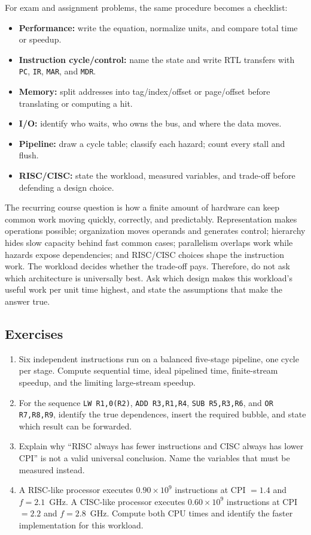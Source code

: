 \documentclass[11pt]{article}
\begin{document}
For exam and assignment problems, the same procedure becomes a checklist:
\begin{itemize}
  \item \textbf{Performance:} write the equation, normalize units, and
        compare total time or speedup.
  \item \textbf{Instruction cycle/control:} name the state and write RTL
        transfers with \texttt{PC}, \texttt{IR}, \texttt{MAR}, and \texttt{MDR}.
  \item \textbf{Memory:} split addresses into tag/index/offset or page/offset
        before translating or computing a hit.
  \item \textbf{I/O:} identify who waits, who owns the bus, and where the
        data moves.
  \item \textbf{Pipeline:} draw a cycle table; classify each hazard; count
        every stall and flush.
  \item \textbf{RISC/CISC:} state the workload, measured variables, and
        trade-off before defending a design choice.
\end{itemize}

The recurring course question is how a finite amount of hardware can keep
common work moving quickly, correctly, and predictably. Representation makes
operations possible; organization moves operands and generates control;
hierarchy hides slow capacity behind fast common cases; parallelism overlaps
work while hazards expose dependencies; and RISC/CISC choices shape the
instruction work. The workload decides whether the trade-off pays. Therefore,
do not ask which architecture is universally best. Ask which design makes
this workload's useful work per unit time highest, and state the assumptions
that make the answer true.

\subsection*{Exercises}
\begin{enumerate}
  \item Six independent instructions run on a balanced five-stage pipeline,
        one cycle per stage. Compute sequential time, ideal pipelined time,
        finite-stream speedup, and the limiting large-stream speedup.
  \item For the sequence \texttt{LW R1,0(R2)}, \texttt{ADD R3,R1,R4},
        \texttt{SUB R5,R3,R6}, and \texttt{OR R7,R8,R9}, identify the true
        dependences, insert the required bubble, and state which result can be
        forwarded.
  \item Explain why ``RISC always has fewer instructions and CISC always has
        lower CPI'' is not a valid universal conclusion. Name the variables
        that must be measured instead.
  \item A RISC-like processor executes $0.90\times10^9$ instructions at
        CPI $=1.4$ and $f=2.1$~GHz. A CISC-like processor executes
        $0.60\times10^9$ instructions at CPI $=2.2$ and $f=2.8$~GHz. Compute
        both CPU times and identify the faster implementation for this
        workload.
\end{enumerate}
\end{document}

